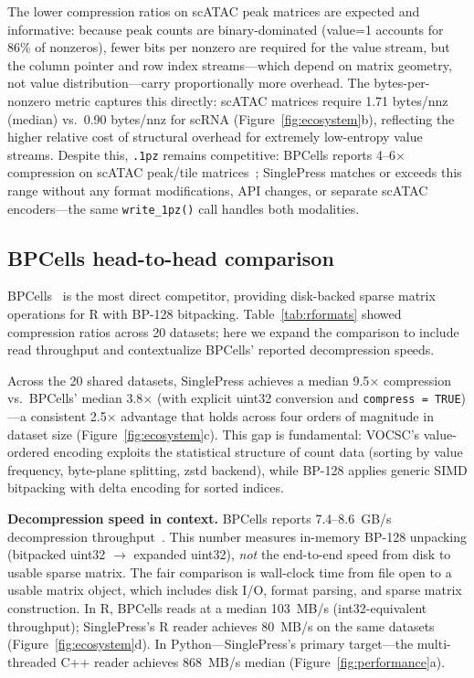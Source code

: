 \documentclass[10pt,twocolumn,letterpaper]{article}
\begin{document}
The lower compression ratios on scATAC peak matrices are expected and informative: because peak counts are binary-dominated (value=1 accounts for 86\% of nonzeros), fewer bits per nonzero are required for the value stream, but the column pointer and row index streams---which depend on matrix geometry, not value distribution---carry proportionally more overhead.
The bytes-per-nonzero metric captures this directly: scATAC matrices require 1.71 bytes/nnz (median) vs.\ 0.90 bytes/nnz for scRNA (Figure~\ref{fig:ecosystem}b), reflecting the higher relative cost of structural overhead for extremely low-entropy value streams.
Despite this, \texttt{.1pz} remains competitive: BPCells reports 4--6$\times$ compression on scATAC peak/tile matrices~\cite{parks2024bpcells}; SinglePress matches or exceeds this range without any format modifications, API changes, or separate scATAC encoders---the same \texttt{write\_1pz()} call handles both modalities.

\subsection{BPCells head-to-head comparison}

BPCells~\cite{parks2024bpcells} is the most direct competitor, providing disk-backed sparse matrix operations for R with BP-128 bitpacking.
Table~\ref{tab:rformats} showed compression ratios across 20 datasets; here we expand the comparison to include read throughput and contextualize BPCells' reported decompression speeds.

Across the 20 shared datasets, SinglePress achieves a median 9.5$\times$ compression vs.\ BPCells' median 3.8$\times$ (with explicit uint32 conversion and \texttt{compress = TRUE})---a consistent 2.5$\times$ advantage that holds across four orders of magnitude in dataset size (Figure~\ref{fig:ecosystem}c).
This gap is fundamental: VOCSC's value-ordered encoding exploits the statistical structure of count data (sorting by value frequency, byte-plane splitting, zstd backend), while BP-128 applies generic SIMD bitpacking with delta encoding for sorted indices.

\textbf{Decompression speed in context.}
BPCells reports 7.4--8.6~GB/s decompression throughput~\cite{parks2024bpcells}.
This number measures in-memory BP-128 unpacking (bitpacked uint32 $\to$ expanded uint32), \emph{not} the end-to-end speed from disk to usable sparse matrix.
The fair comparison is wall-clock time from file open to a usable matrix object, which includes disk I/O, format parsing, and sparse matrix construction.
In R, BPCells reads at a median 103~MB/s (int32-equivalent throughput); SinglePress's R reader achieves 80~MB/s on the same datasets (Figure~\ref{fig:ecosystem}d).
In Python---SinglePress's primary target---the multi-threaded C++ reader achieves 868~MB/s median (Figure~\ref{fig:performance}a).
\end{document}
